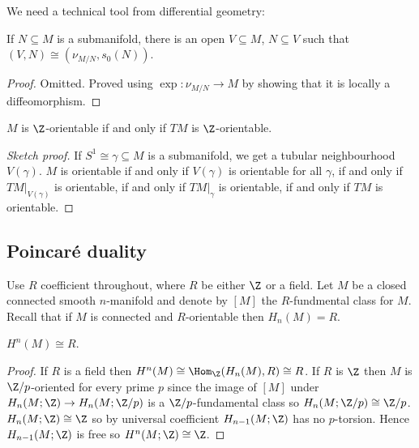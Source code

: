 \documentclass[a4paper]{article}
\begin{document}
We need a technical tool from differential geometry:

\begin{theorem}
  If \(N \subseteq M\) is a submanifold, there is an open \(V\subseteq M\), \(N \subseteq V\) such that \((V, N) \cong (\nu_{M/N}, s_0(N))\).
\end{theorem}

\begin{proof}
  Omitted. Proved using \(\exp: \nu_{M/N} \to M\) by showing that it is locally a diffeomorphism.
\end{proof}

\begin{proposition}
  \(M\) is \(\Z\)-orientable if and only if \(TM\) is \(\Z\)-orientable.
\end{proposition}

\begin{proof}[Sketch proof]
  If \(S^1 \cong \gamma \subseteq M\) is a submanifold, we get a tubular neighbourhood \(V(\gamma)\). \(M\) is orientable if and only if \(V(\gamma)\) is orientable for all \(\gamma\), if and only if \(TM|_{V(\gamma)}\) is orientable, if and only if \(TM|_\gamma\) is orientable, if and only if \(TM\) is orientable.
\end{proof}

\subsection{Poincaré duality}

Use \(R\) coefficient throughout, where \(R\) be either \(\Z\) or a field. Let \(M\) be a closed connected smooth \(n\)-manifold and denote by \([M]\) the \(R\)-fundmental class for \(M\). Recall that if \(M\) is connected and \(R\)-orientable then \(H_n(M) = R\).

\begin{corollary}
  \(H^n(M) \cong R\).
\end{corollary}

\begin{proof}
  If \(R\) is a field then \(H^n(M) \cong \Hom_\Z(H_n(M), R) \cong R\). If \(R\) is \(\Z\) then \(M\) is \(\Z/p\)-oriented for every prime \(p\) since the image of \([M]\) under \(H_n(M; \Z) \to H_n(M; \Z/p)\) is a \(\Z/p\)-fundamental class so \(H_n(M; \Z/p) \cong \Z/p\). \(H_n(M; \Z) \cong \Z\) so by universal coefficient \(H_{n - 1}(M; \Z)\) has no \(p\)-torsion. Hence \(H_{n - 1}(M; \Z)\) is free so \(H^n(M; \Z) \cong \Z\).
\end{proof}
\end{document}
